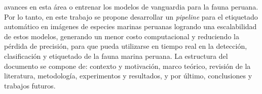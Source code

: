 avances en esta área o entrenar los modelos de vanguardia para la fauna 
peruana.
\newline
\newline
Por lo tanto, en este trabajo se propone desarrollar un \textit{pipeline} 
para el etiquetado automático en imágenes de especies marinas peruanas 
logrando una escalabilidad de estos modelos, generando un menor costo 
computacional y reduciendo la pérdida de precisión, para que pueda 
utilizarse en tiempo real en la detección, clasificación y etiquetado de 
la fauna marina peruana. 
\newline
\newline
La estructura del documento se compone de: contexto y motivación, marco 
teórico, revisión de la literatura, metodología, experimentos y resultados, 
y por último, conclusiones y trabajos futuros.